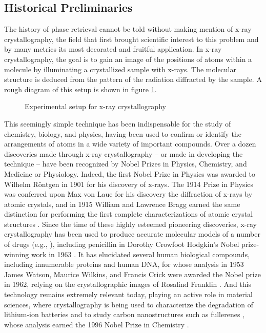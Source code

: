 \subsection{Historical Preliminaries}

The history of phase retrieval cannot be told without making mention of x-ray crystallography, the field that first brought scientific interest to this problem and by many metrics its most decorated and fruitful application.  In x-ray crystallography, the goal is to gain an image of the positions of atoms within a molecule by illuminating a crystallized sample with x-rays.  The molecular structure is deduced from the pattern of the radiation diffracted by the sample.  A rough diagram of this setup is shown in figure \ref{fig:xray_cryst}.

\begin{figure}
  \begin{center}
  \end{center}
  \caption{Experimental setup for x-ray crystallography}
  \label{fig:xray_cryst}
\end{figure}

This seemingly simple technique has been indispensable for the study of chemistry, biology, and physics, having been used to confirm or identify the arrangements of atoms in a wide variety of important compounds.  Over a dozen discoveries made through x-ray crystallography -- or made in developing the technique -- have been recognized by Nobel Prizes in Physics, Chemistry, and Medicine or Physiology.  Indeed, the first Nobel Prize in Physics was awarded to Wilhelm R\"ontgen in 1901 for his discovery of x-rays.  The 1914 Prize in Physics was conferred upon Max von Laue for his discovery the diffraction of x-rays by atomic crystals, and in 1915 William and Lawrence Bragg earned the same distinction for performing the first complete characterizations of atomic crystal structures \cite{galli2014nobel}.  Since the time of these highly esteemed pioneering discoveries, x-ray crystallography has been used to produce accurate molecular models of a number of drugs (e.g., \cite{cell2001antibios, rasmussen2007adrenergic, schindler2000kinase}), including penicillin in Dorothy Crowfoot Hodgkin's Nobel prize-winning work in 1963 \cite{hodgkin1963penicillin}.  It has elucidated several human biological compounds, including innumerable proteins \cite{kimber2003protein, varsani1993isomerase} and human DNA, for whose analysis in 1953 James Watson, Maurice Wilkins, and Francis Crick were awarded the Nobel prize in 1962, relying on the crystallographic images of Rosalind Franklin \cite{franklin1953nature,watson1962nobel_lecture,watson1953nature,wilkins1953nature}.  And this technology remains extremely relevant today, playing an active role in material sciences, where crystallography is being used to characterize the degradation of lithium-ion batteries \cite{hausbrand2015battery, andrej2018battery} and to study carbon nanostructures such as fullerenes \cite{lamb1990carbon, kroto1985fullerene}, whose analysis earned the 1996 Nobel Prize in Chemistry \cite{galli2014nobel}.

